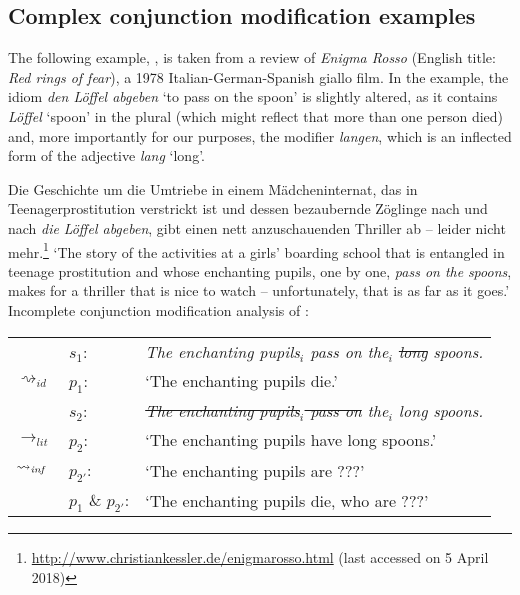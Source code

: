 \documentclass[output=paper]{langsci/langscibook}
\begin{document}
\subsection{Complex conjunction modification examples} \label{complex cases}

The following example, , is taken from a review of \textit{Enigma Rosso} (English title: \textit{Red rings of fear}), a 1978 Italian-German-Spanish giallo film. In the example, the idiom \textit{den Löffel abgeben} `to pass on the spoon' is slightly altered, as it contains \textit{Löffel} `spoon' in the plural (which might reflect that more than one person died) and, more importantly for our purposes, the modifier \textit{langen}, which is an inflected form of the adjective \textit{lang} `long'.

\ea \label{long spoons}
Die Geschichte um die Umtriebe in einem Mädcheninternat, das in Teen\-agerprostitution verstrickt ist und dessen bezaubernde Zöglinge nach und nach \textit{die} \underline{} \textit{Löffel abgeben}, gibt einen nett anzuschauenden Thriller ab -- leider nicht mehr.\footnote{\url{http://www.christiankessler.de/enigmarosso.html} (last accessed on 5 April 2018)}
\glt `The story of the activities at a girls' boarding school that is entangled in teenage prostitution and whose enchanting pupils, one by one, \textit{pass on the} \underline{} \textit{spoons}, makes for a thriller that is nice to watch -- unfortunately, that is as far as it goes.'
\ex \label{analysis long spoons -- incomplete} 
Incomplete conjunction modification analysis of :\smallskip\\
\begin{tabularx}{\linewidth}[t]{@{}llQ@{}}
							& 	$s_{1}$: & \textit{The enchanting pupils$_{i}$ pass on the$_{i}$ \sout{long} spoons.} \\
$\rightsquigarrow_{id}$		&	$p_{1}$: & `The enchanting pupils die.'\medskip\\
							& 	$s_{2}$: & \textit{\sout{The enchanting pupils$_{i}$ pass on} the$_{i}$ long spoons.} \\
$\rightarrow_{lit}$			&	$p_{2}$: & `The enchanting pupils have long spoons.' \\
$\rightsquigarrow_{\text{\itshape inf}}$	&	$p_{2'}$: & `The enchanting pupils are ???'\medskip\\
                            &	$p_{1}$ \& $p_{2'}$: & `The enchanting pupils die, who are ???' \\
\end{tabularx}
\z
\end{document}
